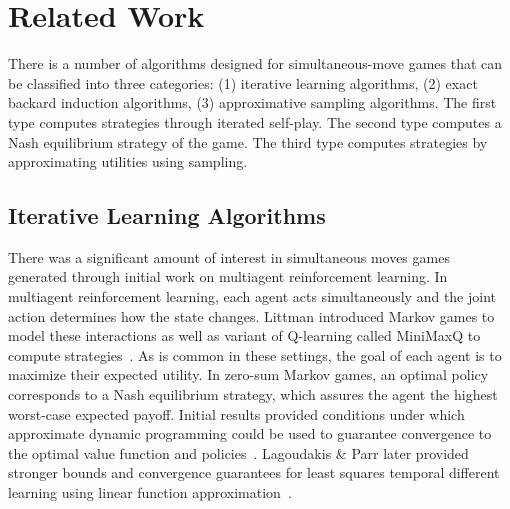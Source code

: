 
\section{Related Work}

There is a number of algorithms designed for simultaneous-move games that can be classified into three categories: 
(1) iterative learning algorithms, 
(2) exact backard induction algorithms, 
(3) approximative sampling algorithms.
The first type computes strategies through iterated self-play.
The second type computes a Nash equilibrium strategy of the game. 
The third type computes strategies by approximating utilities using sampling. 


\subsection{Iterative Learning Algorithms}



There was a significant amount of interest in simultaneous moves games generated through initial work 
on multiagent reinforcement learning. In multiagent reinforcement learning, each agent acts simultaneously and 
the joint action determines how the state changes. Littman introduced Markov games to model these interactions 
as well as variant of Q-learning called MiniMaxQ to compute strategies~\cite{Littman94markovgames,Littman01Value}.
As is common in these settings, the goal of each agent is to maximize their expected utility. 
In zero-sum Markov games, an optimal policy corresponds to a Nash equilibrium strategy, which assures the agent 
the highest worst-case expected payoff. Initial results provided conditions under which approximate dynamic 
programming could be used to guarantee convergence to the optimal value function and 
policies~\cite{Littman96ageneralized}. Lagoudakis \& Parr later provided stronger bounds and convergence guarantees
for least squares temporal different learning using linear function approximation~\cite{Lagoudakis02}. 

